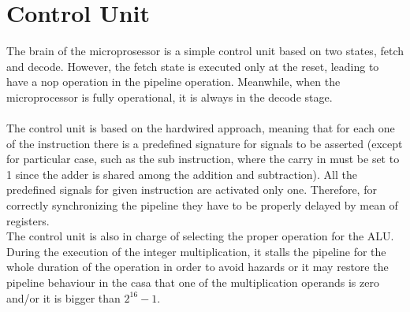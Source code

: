 \section{Control Unit}
The brain of the microprosessor is a simple control unit based on two states, fetch and decode. However, the fetch state is executed only at the reset, leading to have a nop operation in the pipeline operation. Meanwhile, when the microprocessor is fully operational, it is always in the decode stage.\\\\
The control unit is based on the hardwired approach, meaning that for each one of the instruction there is a predefined signature for signals to be asserted (except for particular case, such as the sub instruction, where the carry in must be set to 1 since the adder is shared among the addition and subtraction). All the predefined signals for given instruction are activated only one. Therefore, for correctly synchronizing the pipeline they have to be properly delayed by mean of registers.\\
The control unit is also in charge of selecting the proper operation for the ALU. During the execution of the integer multiplication, it stalls the pipeline for the whole duration of the operation in order to avoid hazards or it may restore the pipeline behaviour in the casa that one of the multiplication operands is zero and/or it is bigger than $2^{16}-1$.


